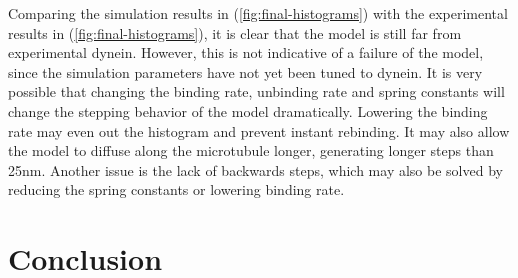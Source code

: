\documentclass[
11pt, %
english, %
singlespacing, %
headsepline, %
chapterinoneline, %
]{MastersDoctoralThesis} %
\begin{document}
Comparing the simulation results in (\ref{fig:final-histograms}) with the experimental results in (\ref{fig:final-histograms}), it is clear that the model is still far from experimental dynein. However, this is not indicative of a failure of the model, since the simulation parameters have not yet been tuned to dynein. It is very possible that changing the binding rate, unbinding rate and spring constants will change the stepping behavior of the model dramatically. Lowering the binding rate may even out the histogram and prevent instant rebinding. It may also allow the model to diffuse along the microtubule longer, generating longer steps than 25nm. Another issue is the lack of backwards steps, which may also be solved by reducing the spring constants or lowering binding rate.\\



\newpage
\chapter{Conclusion}
\label{chap:Conclusion}

\end{document}
